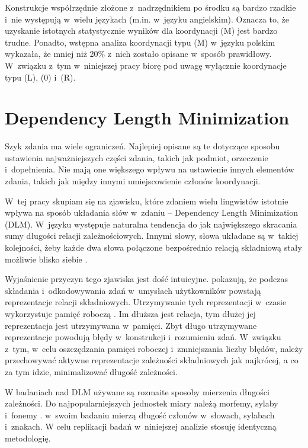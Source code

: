Konstrukcje współrzędnie złożone z~nadrzędnikiem po środku są bardzo rzadkie i~nie występują w~wielu językach (m.in. w~języku angielskim). Oznacza to, że uzyskanie istotnych statystycznie wyników dla koordynacji (M) jest bardzo trudne. Ponadto, wstępna analiza koordynacji typu (M) w~języku polskim wykazała, że mniej niż 20\% z~nich zostało opisane w~sposób prawidłowy. W~związku z~tym w~niniejszej pracy biorę pod uwagę wyłącznie koordynacje typu (L), (0) i~(R).

\section{Dependency Length Minimization}

Szyk zdania ma wiele ograniczeń. Najlepiej opisane są te dotyczące sposobu ustawienia najważniejszych części zdania, takich jak podmiot, orzeczenie i~dopełnienia. Nie mają one większego wpływu na ustawienie innych elementów zdania, takich jak między innymi umiejscowienie członów koordynacji.

W~tej pracy skupiam się na zjawisku, które zdaniem wielu lingwistów istotnie wpływa na sposób układania słów w~zdaniu -- Dependency Length Minimization (DLM). W~języku występuje naturalna tendencja do jak największego skracania sumy długości relacji zależnościowych. Innymi słowy, słowa układane są w~takiej kolejności, żeby każde dwa słowa połączone bezpośrednio relacją składniową stały możliwie blisko siebie \citep{temperley2007minimization}.

Wyjaśnienie przyczyn tego zjawiska jest dość intuicyjne. \cite{king1991individual} pokazują, że podczas składania i~odkodowywania zdań w~umysłach użytkowników powstają reprezentacje relacji składniowych. Utrzymywanie tych reprezentacji w~czasie wykorzystuje pamięć roboczą \citep[s. 596]{king1991individual}. Im dłuższa jest relacja, tym dłużej jej reprezentacja jest utrzymywana w~pamięci. Zbyt długo utrzymywane reprezentacje powodują błędy w~konstrukcji i~rozumieniu zdań. W~związku z~tym, w~celu oszczędzania pamięci roboczej i~zmniejszania liczby błędów, należy przechowywać aktywne reprezentacje zależności składniowych jak najkrócej, a co za tym idzie, minimalizować długość zależności.

W badaniach nad DLM używane są rozmaite sposoby mierzenia długości zależności. Do najpopularniejszych jednostek miary należą morfemy, sylaby i~fonemy \citep{lohmann2014english}. \cite{przepiorkowski2023conjunct} w~swoim badaniu mierzą długość członów w~słowach, sylabach i~znakach. W celu replikacji badań w~niniejszej analizie stosuję identyczną metodologię.

